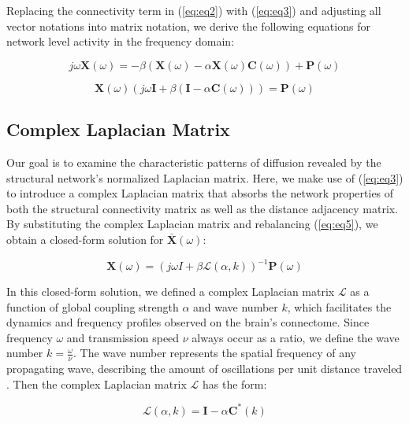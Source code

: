 Replacing the connectivity term in (\ref{eq:eq2}) with (\ref{eq:eq3}) and adjusting all vector notations into matrix notation, we derive the following equations for network level activity in the frequency domain:

\begin{equation}
    \label{eq:eq4}
    j\omega \pmb{X}(\omega) = -\beta (\pmb{X}(\omega) - \alpha \pmb{X}(\omega) \pmb{C}(\omega)) + \pmb{P}(\omega)
\end{equation}


\begin{equation}
    \label{eq:eq5}
    \pmb{X}(\omega)(j\omega \pmb{I} + \beta (\pmb{I} - \alpha \pmb{C}(\omega)))=  \pmb{P}(\omega)
\end{equation}

\subsection{Complex Laplacian Matrix}
Our goal is to examine the characteristic patterns of diffusion revealed by the structural network's normalized Laplacian matrix. Here, we make use of (\ref{eq:eq3}) to introduce a complex Laplacian matrix that absorbs the network properties of both the structural connectivity matrix as well as the distance adjacency matrix. By substituting the complex Laplacian matrix and rebalancing (\ref{eq:eq5}), we obtain a closed-form solution for $\pmb{\bar{X}}(\omega)$:

\begin{equation}
\label{eq:eq6}
\pmb{X}(\omega) = (j \omega I + \beta \mathcal{L}(\alpha, k))^{-1} \pmb{P}(\omega)
\end{equation}

In this closed-form solution, we defined a complex Laplacian matrix $\mathcal{L}$ as a function of global coupling strength $\alpha$ and wave number $k$, which facilitates the dynamics and frequency profiles observed on the brain's connectome. Since frequency $\omega$ and transmission speed $\nu$ always occur as a ratio, we define the wave number $k = \frac{\omega}{\nu}$. The wave number represents the spatial frequency of any propagating wave, describing the amount of oscillations per unit distance traveled \cite{French1971}. Then the complex Laplacian matrix $\mathcal{L}$ has the form:

\begin{equation}
    \label{eq:eq7}
    \mathcal{L}(\alpha, k) = \pmb{I} - \alpha \pmb{C}^{*}(k)
\end{equation}

